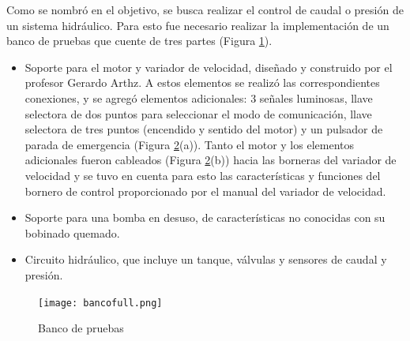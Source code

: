 Como se nombró en el objetivo, se busca realizar el control de caudal o presión de un sistema hidráulico. Para esto fue necesario realizar la implementación de un banco de pruebas que cuente de tres partes (Figura \ref{fig:bancofull}).
\begin{itemize}
	\item Soporte para el motor y variador de velocidad,  diseñado y construido por el profesor Gerardo Arthz. A estos elementos se realizó las correspondientes conexiones, y se agregó elementos adicionales: 3 señales luminosas, llave selectora de dos puntos para seleccionar el modo de comunicación, llave selectora de tres puntos (encendido y sentido del motor) y un pulsador de parada de emergencia (Figura \ref{fig:banco}(a)).
	Tanto el motor y los elementos adicionales fueron cableados (Figura \ref{fig:banco}(b)) hacia las borneras del variador de velocidad y se tuvo en cuenta para esto las características y funciones del bornero de control proporcionado por el manual del variador de velocidad\cite{InstaManual}. 
	
	\item Soporte para una bomba en desuso, de características no conocidas con su bobinado quemado.
	\item Circuito hidráulico, que incluye un tanque, válvulas y sensores de caudal y presión.
\end{itemize}




\begin{figure}[htb]
	\centering
	\texttt{[image: bancofull.png]}
	\label{fig:bancofull}
\end{figure}


\begin{figure}[H]
	\centering
	\caption{Banco de pruebas} \label{fig:banco}
\end{figure}

